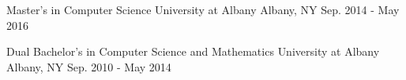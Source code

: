 \vspace{-3mm}

\begin{cventries}
   \cventry
   {Master's in Computer Science}
   {University at Albany}
   {Albany, NY}
   {Sep. 2014 - May 2016}
   {}
   \vspace{-3.5mm}

\vspace{1.0mm}
   \cventry
   {Dual Bachelor's in Computer Science and Mathematics}
   {University at Albany}
   {Albany, NY}
   {Sep. 2010 - May 2014}
   {}
   \vspace{-3.5mm}

\end{cventries}
